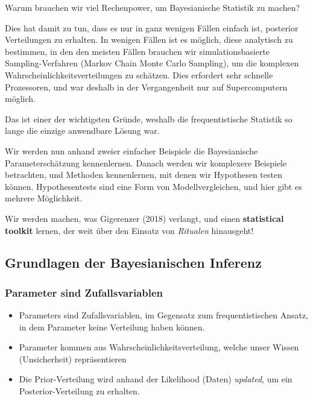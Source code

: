 \documentclass[]{tufte-handout}
\begin{document}
Warum brauchen wir viel Rechenpower, um Bayesianische Statistik zu
machen?

Dies hat damit zu tun, dass es nur in ganz wenigen Fällen einfach ist,
posterior Verteilungen zu erhalten. In wenigen Fällen ist es möglich,
diese analytisch zu bestimmen, in den den meisten Fällen brauchen wir
simulationsbasierte Sampling-Verfahren (Markov Chain Monte Carlo
Sampling), um die komplexen Wahrscheinlichkeitsverteilungen zu schätzen.
Dies erfordert sehr schnelle Prozessoren, und war deshalb in der
Vergangenheit nur auf Supercomputern möglich.

Das ist einer der wichtigsten Gründe, weshalb die frequentistische
Statistik so lange die einzige anwendbare Lösung war.

Wir werden nun anhand zweier einfacher Beispiele die Bayesianische
Parameterschätzung kennenlernen. Danach werden wir komplexere Beispiele
betrachten, und Methoden kennenlernen, mit denen wir Hypothesen testen
können. Hypothesentests sind eine Form von Modellvergleichen, und hier
gibt es mehrere Möglichkeit.

Wir werden machen, was Gigerenzer (2018) verlangt, und einen
\textbf{statistical toolkit} lernen, der weit über den Einsatz von
\emph{Ritualen} hinausgeht!

\hypertarget{grundlagen-der-bayesianischen-inferenz}{%
\subsection{Grundlagen der Bayesianischen
Inferenz}\label{grundlagen-der-bayesianischen-inferenz}}

\hypertarget{parameter-sind-zufallsvariablen}{%
\subsubsection{Parameter sind
Zufallsvariablen}\label{parameter-sind-zufallsvariablen}}

\begin{itemize}
\item
  Parameters sind Zufallsvariablen, im Gegensatz zum frequentistischen
  Ansatz, in dem Parameter keine Verteilung haben können.
\item
  Parameter kommen aus Wahrscheinlichkeitsverteilung, welche unser
  Wissen (Unsicherheit) repräsentieren
\item
  Die Prior-Verteilung wird anhand der Likelihood (Daten)
  \emph{updated}, um ein Posterior-Verteilung zu erhalten.
\end{itemize}
\end{document}
